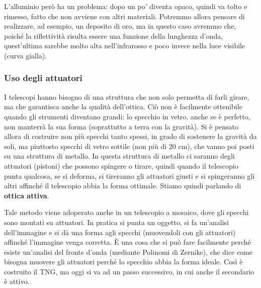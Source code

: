 \vspace{0.2cm}L'alluminio però ha un problema: dopo un po' diventa opaco, quindi va tolto e rimesso, fatto che non avviene con altri materiali. Potremmo allora pensare di realizzare, ad esempio, un deposito di oro, ma in questo caso avremmo che, poiché la riflettività risulta essere una funzione della lunghezza d'onda, quest'ultima sarebbe molto alta nell'infrarosso e poco invece nella luce visibile (curva gialla).


 
\subsubsection{Uso degli attuatori}
I telescopi hanno bisogno di una struttura che non solo permetta di farli girare, ma che garantisca anche la qualità dell'ottica. Ciò non è facilmente ottenibile quando gli strumenti diventano grandi: lo specchio in vetro, anche se è perfetto, non manterrà la sua forma (soprattutto a terra con la gravità). Si è pensato allora di costruire non più specchi tanto spessi, in grado di sostenere la gravità da soli, ma piuttosto specchi di vetro sottile (non più di 20 cm), che vanno poi posti su una struttura di metallo. In questa struttura di metallo ci saranno degli attuatori (pistoni) che possono spingere o tirare, quindi quando il telescopio punta qualcosa, se si deforma, si tireranno gli attuatori giusti e si spingeranno gli altri affinché il telescopio abbia la forma ottimale. Stiamo quindi parlando di \textbf{ottica attiva}.

Tale metodo viene adoperato anche in un telescopio a mosaico, dove gli specchi sono montati su attuatori. In pratica si punta un oggetto, si fa un'analisi dell'immagine e si dà una forma agli specchi (muovendoli con gli attuatori) affinché l'immagine venga corretta. È una cosa che si può fare facilmente perché esiste un'analisi del fronte d'onda (mediante Polinomi di Zernike), che dice come bisogna muovere gli attuatori perché lo specchio abbia la forma ideale. Così è costruito il TNG, ma oggi si va ad un passo successivo, in cui anche il secondario è attivo.

